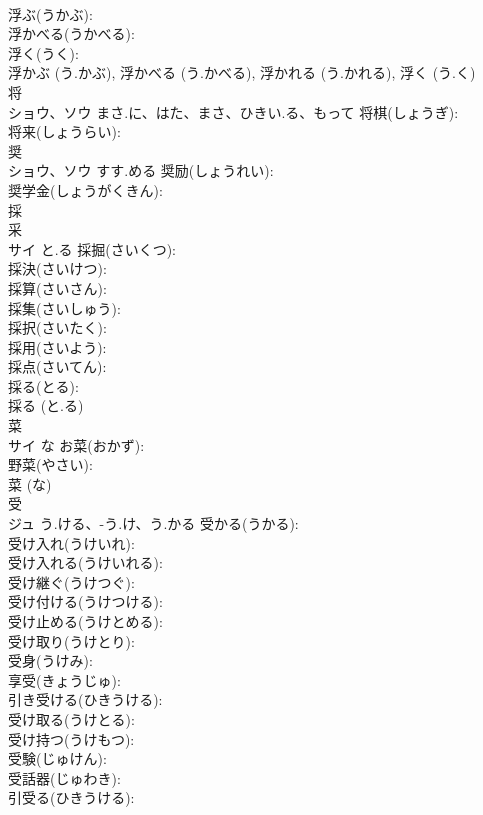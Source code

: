\documentclass[8pt]{extreport}
\begin{document}
\begin{CJK}{UTF8}{min}
\\	浮ぶ(うかぶ): 
\\	浮かべる(うかべる): 
\\	浮く(うく): 
\\	浮かぶ (う.かぶ), 浮かべる (う.かべる), 浮かれる (う.かれる), 浮く (う.く)
\\	将			
\\	ショウ、ソウ	まさ.に、はた、まさ、ひきい.る、もって	将棋(しょうぎ): 
\\	将来(しょうらい): 
\\	奨			
\\	ショウ、ソウ	すす.める	奨励(しょうれい): 
\\	奨学金(しょうがくきん): 
\\	採			
\\	采 
\\	サイ	と.る	採掘(さいくつ): 
\\	採決(さいけつ): 
\\	採算(さいさん): 
\\	採集(さいしゅう): 
\\	採択(さいたく): 
\\	採用(さいよう): 
\\	採点(さいてん): 
\\	採る(とる): 
\\	採る (と.る)
\\	菜			
\\	サイ	な	お菜(おかず): 
\\	野菜(やさい): 
\\	菜 (な)
\\	受			
\\	ジュ	う.ける、-う.け、う.かる	受かる(うかる): 
\\	受け入れ(うけいれ): 
\\	受け入れる(うけいれる): 
\\	受け継ぐ(うけつぐ): 
\\	受け付ける(うけつける): 
\\	受け止める(うけとめる): 
\\	受け取り(うけとり): 
\\	受身(うけみ): 
\\	享受(きょうじゅ): 
\\	引き受ける(ひきうける): 
\\	受け取る(うけとる): 
\\	受け持つ(うけもつ): 
\\	受験(じゅけん): 
\\	受話器(じゅわき): 
\\	引受る(ひきうける): 

\end{CJK}
\end{document}
